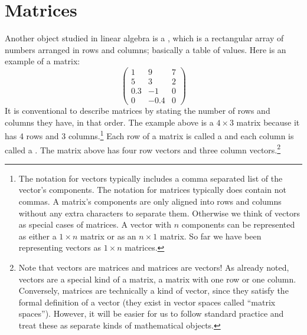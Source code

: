 \section{Matrices}\label{S:Matrices}

   Another object studied in linear algebra is a , which is a 
rectangular array of numbers arranged in rows and columns; basically a table of 
values. Here is an example of a matrix:
\[
\begin{pmatrix}
 1  &   9  & 7 \\
 5  &   3  & 2 \\
0.3 &  -1  & 0 \\
 0  & -0.4 & 0
\end{pmatrix}
\]
It is conventional to describe matrices by stating the number of rows and 
columns they have, in that order. The example above is a $4 \times 3$ 
matrix because it has 4 rows and 3 columns.\footnote{The notation for vectors typically includes a comma separated list of the vector's components. The notation for matrices typically does contain not commas. A  matrix's components are only aligned into rows and columns without any extra characters to separate them. Otherwise we think of vectors as special cases of matrices. A vector with $n$ components can be represented as either a $1 \times n$ matrix or as an $n \times 1$ matrix. So far we have been representing vectors as $1 \times n$ matrices.}  Each row of a matrix is called a  and each column is called a . The matrix above has four row vectors and 
three column vectors.\footnote{Note that vectors  are matrices and matrices are vectors!  As already noted, vectors are a special kind of a matrix, 
a matrix with one row or one column. Conversely, matrices are technically a 
kind of vector, since they satisfy the formal definition of a vector (they 
exist in vector spaces called ``matrix spaces''). However, it will be easier for us to follow standard practice and treat these as separate kinds of mathematical objects.}

